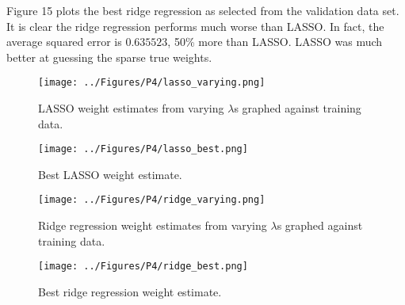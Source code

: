 \documentclass[a4paper,twoside]{article}
\begin{document}
Figure 15 plots the best ridge regression as selected from the validation data set. It is clear the ridge regression performs much worse than LASSO. In fact, the average squared error is $0.635523$, 50\% more than LASSO. LASSO was much better at guessing the sparse true weights.

\begin{figure}[h]
  \texttt{[image: ../Figures/P4/lasso\_varying.png]}
  \caption{LASSO weight estimates from varying $\lambda$s graphed against training data.}
  \label{fig:lasso_varying}
\end{figure}

\begin{figure}[h]
  \texttt{[image: ../Figures/P4/lasso\_best.png]}
  \caption{Best LASSO weight estimate.}
  \label{fig:lasso_best}
\end{figure}

\begin{figure}[h]
  \texttt{[image: ../Figures/P4/ridge\_varying.png]}
  \caption{Ridge regression weight estimates from varying $\lambda$s graphed against training data.}
  \label{fig:ridge_varying}
\end{figure}

\begin{figure}[h]
  \texttt{[image: ../Figures/P4/ridge\_best.png]}
  \caption{Best ridge regression weight estimate.}
  \label{fig:ridge_best}
\end{figure}




\vfill
\end{document}
